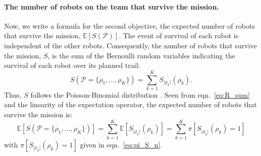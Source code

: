 \documentclass[11pt, oneside]{article}
\begin{document}
\paragraph{The number of robots on the team that survive the mission.} 
Now, we write a formula for the second objective, the expected number of robots that survive the mission, $\mathbb{E}[S(\mathcal{P})]$.
The event of survival of each robot is independent of the other robots.
Consequently, the number of robots that survive the mission, $S$, is the sum of the Bernoulli random variables indicating the survival of each robot over its planned trail:
\begin{equation}
	S(\mathcal{P}=\{\rho_1, ..., \rho_K\})=\sum_{k=1}^K S_{\lvert \rho_k \rvert}(\rho_k). \label{eq:R_sum}
\end{equation}
Thus, $S$ follows the Poisson-Binomial distribution \cite{tang2023poisson}.
Seen from eqn.~\ref{eq:R_sum} and the linearity of the expectation operator, the expected number of robots that survive the mission is:
\begin{equation}
	\mathbb{E}[S(\mathcal{P}=\{\rho_1, ..., \rho_K\})]=\sum_{k=1}^K \mathbb{E}[S_{\lvert \rho_k \rvert}(\rho_k)] = \sum_{k=1}^K  \pi[S_{\lvert \rho_k \rvert}(\rho_k) = 1] \label{eq:formula_obj2}
\end{equation} with $\pi[S_{\lvert \rho_k \rvert}(\rho_k) = 1]$ given in eqn.~\ref{eq:pi_S_n}.
\end{document}
